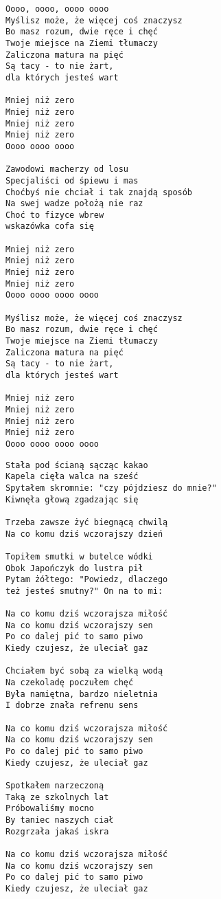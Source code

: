 \documentclass[12pt]{article}
\begin{document}
\begin{verbatim}
Oooo, oooo, oooo oooo
Myślisz może, że więcej coś znaczysz
Bo masz rozum, dwie ręce i chęć
Twoje miejsce na Ziemi tłumaczy
Zaliczona matura na pięć
Są tacy - to nie żart,
dla których jesteś wart

Mniej niż zero
Mniej niż zero
Mniej niż zero
Mniej niż zero
Oooo oooo oooo

Zawodowi macherzy od losu
Specjaliści od śpiewu i mas
Choćbyś nie chciał i tak znajdą sposób
Na swej wadze położą nie raz
Choć to fizyce wbrew
wskazówka cofa się

Mniej niż zero
Mniej niż zero
Mniej niż zero
Mniej niż zero
Oooo oooo oooo oooo

Myślisz może, że więcej coś znaczysz
Bo masz rozum, dwie ręce i chęć
Twoje miejsce na Ziemi tłumaczy
Zaliczona matura na pięć
Są tacy - to nie żart,
dla których jesteś wart

Mniej niż zero
Mniej niż zero
Mniej niż zero
Mniej niż zero
Oooo oooo oooo oooo
\end{verbatim}
\clearpage

\begin{verbatim}
Stała pod ścianą sącząc kakao
Kapela cięła walca na sześć
Spytałem skromnie: "czy pójdziesz do mnie?"
Kiwnęła głową zgadzając się

Trzeba zawsze żyć biegnącą chwilą
Na co komu dziś wczorajszy dzień

Topiłem smutki w butelce wódki
Obok Japończyk do lustra pił
Pytam żółtego: "Powiedz, dlaczego
też jesteś smutny?" On na to mi:

Na co komu dziś wczorajsza miłość
Na co komu dziś wczorajszy sen
Po co dalej pić to samo piwo
Kiedy czujesz, że uleciał gaz

Chciałem być sobą za wielką wodą
Na czekoladę poczułem chęć
Była namiętna, bardzo nieletnia
I dobrze znała refrenu sens

Na co komu dziś wczorajsza miłość
Na co komu dziś wczorajszy sen
Po co dalej pić to samo piwo
Kiedy czujesz, że uleciał gaz

Spotkałem narzeczoną
Taką ze szkolnych lat
Próbowaliśmy mocno
By taniec naszych ciał
Rozgrzała jakaś iskra

Na co komu dziś wczorajsza miłość
Na co komu dziś wczorajszy sen
Po co dalej pić to samo piwo
Kiedy czujesz, że uleciał gaz
\end{verbatim}
\clearpage
\end{document}
